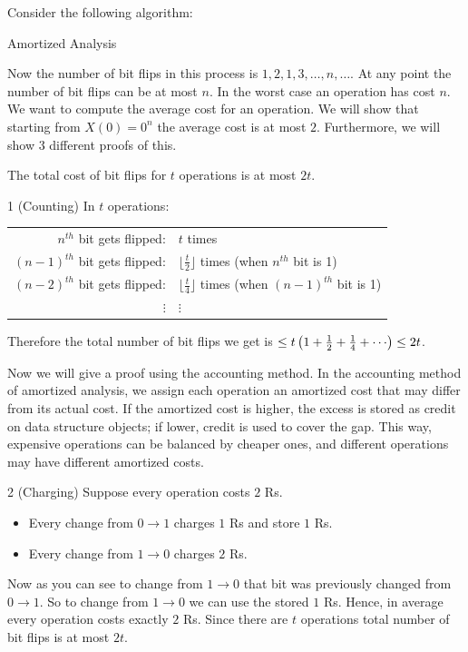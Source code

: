 Consider the following algorithm:
\begin{algorithm}[]
	\caption{Amortized Analysis}
	\DontPrintSemicolon
\end{algorithm}
Now the number of bit flips in this process is $1,2,1,3,\dots, n,\dots$. At any point the number of bit flips can be at most $n$. In the worst case an operation has cost $n$. We want to compute the average cost for an operation. We will show that starting from $X(0)=0^n$ the average cost is at most $2$. Furthermore, we will show 3 different proofs of this.
\begin{lemma}{}{}
	The total  cost of bit flips for $t$ operations is at most $2t$.
\end{lemma}
\begin{proofmany}{1 (Counting)}
	In $t$ operations:
	\begin{center}
		\begin{tabular}{rl}
			$n^{th}$ bit gets flipped:     & $t$ times                                                    \\
			$(n-1)^{th}$ bit gets flipped: & $\lfloor\frac{t}2\rfloor$ times (when $n^{th}$ bit is 1)     \\
			$(n-2)^{th}$ bit gets flipped: & $\lfloor\frac{t}4\rfloor$ times (when $(n-1)^{th}$ bit is 1) \\
			$\vdots$\hspace{1cm}           & \hspace{1cm}$\vdots$
		\end{tabular}
	\end{center}
	Therefore the total number of bit flips we get is $\leq t\lt(1+\frac12+\frac14+\cdots\rt)\leq 2t$.
\end{proofmany}

Now we will give a proof using the accounting method. In the accounting method of amortized analysis, we assign each operation an amortized cost that may differ from its actual cost. If the amortized cost is higher, the excess is stored as credit on data structure objects; if lower, credit is used to cover the gap. This way, expensive operations can be balanced by cheaper ones, and different operations may have different amortized costs.

\begin{proofmany}{2 (Charging)}
	Suppose every operation costs $2$ Rs. \begin{itemize}
		\item Every change from $0\to 1$ charges $1$ Rs and store $1$ Rs.
		\item Every change from $1\to 0$ charges $2$ Rs.
	\end{itemize}
	Now as you can see to change from $1\to 0$ that bit was previously changed from $0\to 1$. So to change from $1\to 0$ we can use the stored $1$ Rs. Hence, in average every operation costs exactly $2$ Rs. Since there are $t$ operations total number of bit flips is at most $2t$.
\end{proofmany}

